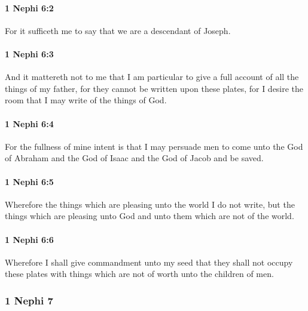 		\paragraph{1 Nephi 6:2} %
			\label{1NEPHI-6-2}

			For it sufficeth me to say that we are a descendant of Joseph.

		\paragraph{1 Nephi 6:3} %
			\label{1NEPHI-6-3}

			And it mattereth not to me that I am particular to give a full account
			of all the things of my father,
			for they cannot be written upon these plates,
			for I desire the room that I may write of the things of God.

		\paragraph{1 Nephi 6:4} %
			\label{1NEPHI-6-4}

			For the fullness of mine intent is that I may persuade men to come
			unto the God of Abraham and the God of Isaac and the God of Jacob and be saved.

		\paragraph{1 Nephi 6:5} %
			\label{1NEPHI-6-5}

			Wherefore the things which are pleasing unto the world I do not write,
			but the things which are pleasing unto God
			and unto them which are not of the world.

		\paragraph{1 Nephi 6:6} %
			\label{1NEPHI-6-6}

			Wherefore I shall give commandment unto my seed
			that they shall not occupy these plates with things
			which are not of worth unto the children of men.
			
	\subsubsection{1 Nephi 7} %
		\label{1NEPHI-7}
		
